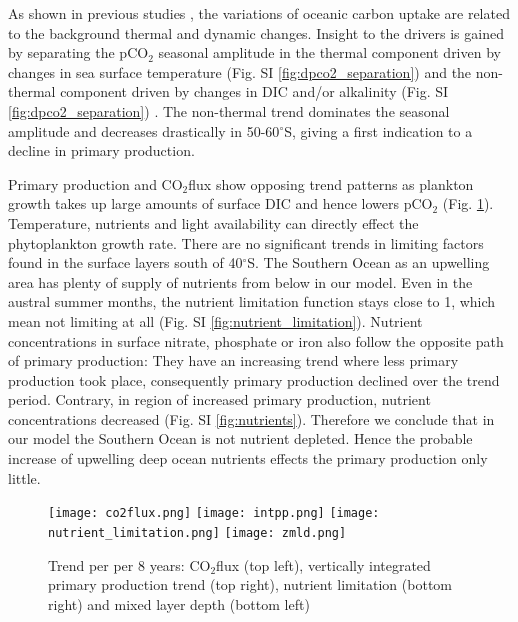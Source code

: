 \documentclass[12pt]{article}
\begin{document}
As shown in previous studies \citep{LeQuere2007}, the variations of oceanic carbon uptake are related to the background thermal and dynamic changes. Insight to the drivers is gained by separating the pCO$_2$ seasonal amplitude in the thermal component driven by changes in sea surface temperature (Fig. SI \ref{fig:dpco2_separation}) and the non-thermal component driven by changes in DIC and/or alkalinity (Fig. SI \ref{fig:dpco2_separation}) \citep{Takahashi2002}. The non-thermal trend dominates the seasonal amplitude and decreases drastically in 50-60$^\circ$S, giving a first indication to a decline in primary production.





Primary production and CO$_2$flux show opposing trend patterns as plankton growth takes up large amounts of surface DIC and hence lowers pCO$_2$ (Fig. \ref{fig:co2flux_intpp}). 
Temperature, nutrients and light availability can directly effect the phytoplankton growth rate. There are no significant trends in limiting factors found in the surface layers south of 40$^\circ$S. The Southern Ocean as an upwelling area has plenty of supply of nutrients from below in our model. Even in the austral summer months, the nutrient limitation function stays close to 1, which mean not limiting at all (Fig. SI \ref{fig:nutrient_limitation}). Nutrient concentrations in surface nitrate, phosphate or iron also follow the opposite path of primary production: They have an increasing trend where less primary production took place, consequently primary production declined over the trend period. Contrary, in region of increased primary production, nutrient concentrations decreased (Fig. SI \ref{fig:nutrients}). Therefore we conclude that in our model the Southern Ocean is not nutrient depleted. Hence the probable increase of upwelling deep ocean nutrients effects the primary production only little.

\begin{figure}[h]
\texttt{[image: co2flux.png]}
\texttt{[image: intpp.png]} %
\texttt{[image: nutrient\_limitation.png]} %
\texttt{[image: zmld.png]} 
\caption{Trend per per 8 years: CO$_2$flux (top left), vertically integrated primary production trend (top right), nutrient limitation (bottom right) and mixed layer depth (bottom left)}
\label{fig:co2flux_intpp}
\end{figure}
\end{document}
